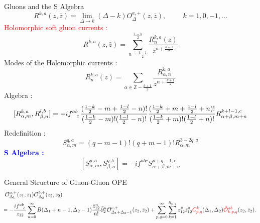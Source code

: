 \documentclass[final]{beamer}
\newlength{\colwidth}
\begin{document}
\begin{frame}[t]
\begin{columns}[t]
\begin{column}{\colwidth}
\begin{block}{Gluons and the S Algebra}
			\begin{equation}
				\label{eq:soft1}
				R^{k,a}(z,\bar{z}) = \lim_{\Delta \to k}(\Delta-k)O^{a,+}_{\Delta}(z,\bar{z}) , \hspace{1cm} k=1,0,-1,...
			\end{equation}
			\textcolor{red}{Holomorphic soft gluon currents :}
			\begin{equation}
				\label{eq:soft2}
				R^{k,a}(z,\bar{z}) =\sum_{n=\frac{k-1}{2}}^{\frac{1-k}{2}}\frac{R^{k,a}_{n}(z)}{\bar{z}^{n+\frac{k-1}{2}}}
			\end{equation}
			Modes of the Holomorphic currents :
		\begin{equation}
			\label{eq:soft3}
			R^{k,a}_{n}(z)=\sum_{\alpha\in \mathbb{Z}-\frac{k+1}{2}} \frac{R^{k,a}_{\alpha,n}}{z^{\alpha+\frac{k+1}{2}}}
		\end{equation}
		Algebra :
		\begin{equation}
			\small
			\label{eq:soft5}
			[R^{k,a}_{\alpha,m},R^{l,b}_{\beta,n}]=-i\tensor{f}{^a^b_c}\frac{(\frac{1-k}{2}-m+\frac{1-l}{2}-n)!}{(\frac{1-k}{2}-m)!(\frac{1-l}{2}-n)!}	
			\frac{(\frac{1-k}{2}+m+\frac{1-l}{2}+n)!}{(\frac{1-k}{2}+m)!(\frac{1-l}{2}+n)!}R^{k+l-1,c}_{\alpha+\beta,m+n}
		\end{equation}
		Redefinition :
		\begin{equation}
			\label{eq:soft6}
			S^{q,a}_{\alpha,m}=(q-m-1)!(q+m-1)!R^{3-2q,a}_{\alpha,m}
		\end{equation}
		\textcolor{blue}{\textbf{S Algebra :}}
		\begin{equation}
			\label{eq:soft7}
			[S^{p,a}_{\alpha,m},S^{q,b}_{\beta,n}]=-if^{abc}S^{p+q-1,c}_{\alpha+\beta,m+n}
		\end{equation}
		\end{block}
		\begin{block}{General Structure of Gluon-Gluon OPE}
			\begin{equation}
				\begin{split}
					\label{eq:ope1}
					&\mathcal{O}^{a,+}_{\Delta_{1}}(z_{1},\bar{z}_{1}) \mathcal{O}^{b,+}_{\Delta_{2}}(z_{2},\bar{z}_{2})\\
					&\hspace{-2mm}
					=-\frac{i\tensor{f}{^a^b_c}}{z_{12}}\sum_{n=0}^{\infty}B(\Delta_{1}+n-1,\Delta_{2}-1)\frac{\bar{z}^{n}_{12}}{n!}\bar\partial^{n}_{2}\mathcal{O}^{c,+}_{\Delta_{1}+\Delta_{2}-1}(z_{2},\bar{z}_{2})
					+\sum_{p,q=0}^{\infty}\sum_{k=1}^{\tilde{n}_{p,q}}z^{p}_{12}\bar{z}^{q}_{12}\textcolor{red}{C^{k}_{p,q}}(\Delta_{1},\Delta_{2})\textcolor{red}{\tilde{\mathcal{O}}^{ab}_{k,p,q}}(z_{2},\bar{z}_{2}).

\end{split}
\end{equation}
\end{block}
\end{column}
\end{columns}
\end{frame}
\end{document}

